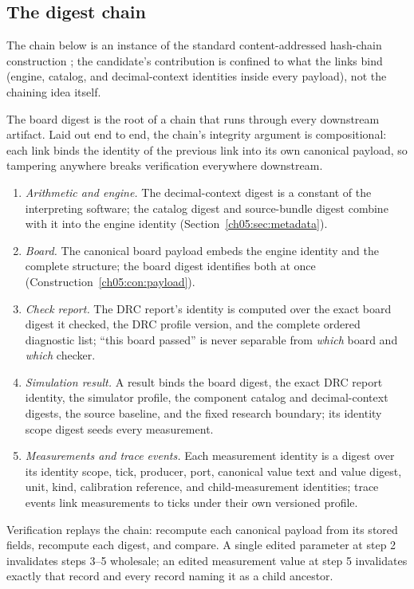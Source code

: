 \subsection{The digest chain}\label{ch05:sec:chain}

The chain below is an instance of the standard content-addressed
hash-chain construction \cite{merkle}; the candidate's contribution is
confined to what the links bind (engine, catalog, and decimal-context
identities inside every payload), not the chaining idea itself.

The board digest is the root of a chain that runs through every
downstream artifact. Laid out end to end, the chain's integrity
argument is compositional: each link binds the
identity of the previous link into its own canonical payload, so
tampering anywhere breaks verification everywhere downstream.

\begin{protocol}\label{ch05:proto:chain}
\begin{enumerate}
\item \emph{Arithmetic and engine.} The decimal-context digest is a
constant of the interpreting software; the catalog digest and
source-bundle digest combine with it into the engine identity
(Section~\ref{ch05:sec:metadata}).
\item \emph{Board.} The canonical board payload embeds the engine
identity and the complete structure; the board digest identifies both
at once (Construction~\ref{ch05:con:payload}).
\item \emph{Check report.} The DRC report's identity is computed over
the exact board digest it checked, the DRC profile version, and the
complete ordered diagnostic list; ``this board passed'' is never
separable from \emph{which} board and \emph{which} checker.
\item \emph{Simulation result.} A result binds the board digest, the
exact DRC report identity, the simulator profile, the component
catalog and decimal-context digests, the source baseline, and the fixed
research boundary; its identity scope digest seeds every measurement.
\item \emph{Measurements and trace events.} Each measurement identity
is a digest over its identity scope, tick, producer, port, canonical
value text and value digest, unit, kind, calibration reference, and
child-measurement identities; trace events link measurements to ticks
under their own versioned profile.
\end{enumerate}
Verification replays the chain: recompute each canonical payload from
its stored fields, recompute each digest, and compare. A single edited
parameter at step 2 invalidates steps 3--5 wholesale; an edited
measurement value at step 5 invalidates exactly that record and every
record naming it as a child ancestor.
\end{protocol}

